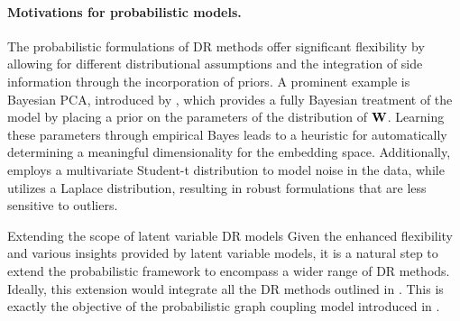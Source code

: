 \paragraph{Motivations for probabilistic models.}  
The probabilistic formulations of DR methods offer significant flexibility by allowing for different distributional assumptions and the integration of side information through the incorporation of priors. A prominent example is Bayesian PCA, introduced by \cite{bishop1998bayesian}, which provides a fully Bayesian treatment of the model by placing a prior on the parameters of the distribution of ${\mathbf{W}}$. Learning these parameters through empirical Bayes leads to a heuristic for automatically determining a meaningful dimensionality for the embedding space. Additionally, \cite{zhao2006probabilistic} employs a multivariate Student-t distribution to model noise in the data, while \cite{wang2012probabilistic} utilizes a Laplace distribution, resulting in robust formulations that are less sensitive to outliers.

\begin{prob}{Extending the scope of latent variable DR models}\label{prob:probabilistic_models}
    Given the enhanced flexibility and various insights provided by latent variable models, it is a natural step to extend the probabilistic framework to encompass a wider range of DR methods. Ideally, this extension would integrate all the DR methods outlined in . This is exactly the objective of the probabilistic graph coupling model introduced in .
\end{prob}
